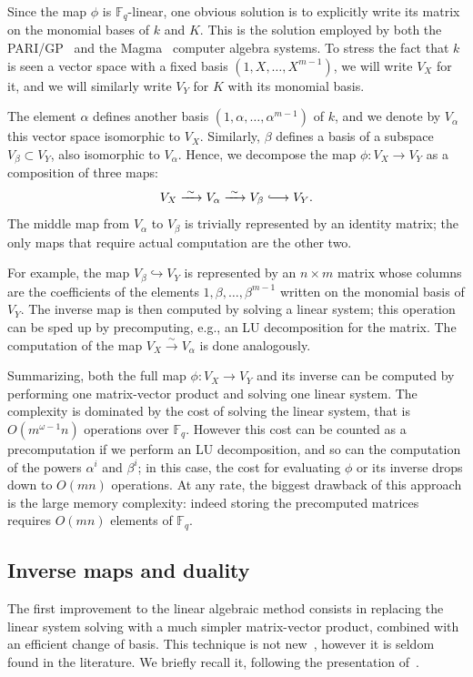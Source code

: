\documentclass[12pt]{article}
\theoremstyle{plain}
\theoremstyle{definition}
\def\F{\ensuremath{\mathbb{F}}}
\begin{document}
Since the map $\phi$ is $\F_q$-linear, one obvious solution is to
explicitly write its matrix on the monomial bases of $k$ and $K$. %
This is the solution employed by both the PARI/GP~\cite{Pari} and the
Magma~\cite{MAGMA,bosma+cannon+steel97} computer algebra systems. %
To stress the fact that $k$ is seen a vector space with a fixed basis
$(1,X,\dots,X^{m-1})$, we will write $V_X$ for it, and we will
similarly write $V_Y$ for $K$ with its monomial basis. %

The element $\alpha$ defines another basis
$(1,\alpha,\dots,\alpha^{m-1})$ of $k$, and we denote by $V_\alpha$
this vector space isomorphic to $V_X$. %
Similarly, $\beta$ defines a basis of a subspace $V_\beta\subset V_Y$,
also isomorphic to $V_\alpha$. %
Hence, we decompose the map $\phi:V_X\to V_Y$ as a composition of
three maps:
\[V_X \xrightarrow{\;\sim\;} V_\alpha \xrightarrow{\;\sim\;} V_\beta \lhook\joinrel\longrightarrow
  V_Y.\] %
The middle map from $V_\alpha$ to $V_\beta$ is trivially represented
by an identity matrix; the only maps that require actual computation
are the other two. %

For example, the map $V_\beta\hookrightarrow V_Y$ is represented by an
$n\times m$ matrix whose columns are the coefficients of the elements
$1,\beta,\dots,\beta^{m-1}$ written on the monomial basis of $V_Y$. %
The inverse map is then computed by solving a linear system; this
operation can be sped up by precomputing, e.g., an LU decomposition
for the matrix. %
The computation of the map $V_X\xrightarrow{\sim}V_\alpha$ is done
analogously.

Summarizing, both the full map $\phi:V_X\to V_Y$ and its inverse can
be computed by performing one matrix-vector product and solving one
linear system. %
The complexity is dominated by the cost of solving the linear system,
that is $O(m^{\omega-1}n)$ operations over $\F_q$. %
However this cost can be counted as a precomputation if we perform an
LU decomposition, and so can the computation of the powers $\alpha^i$
and $\beta^i$; in this case, the cost for evaluating $\phi$ or its
inverse drops down to $O(mn)$ operations. %
At any rate, the biggest drawback of this approach is the large memory
complexity: indeed storing the precomputed matrices requires $O(mn)$
elements of $\F_q$.

\subsection{Inverse maps and duality}

The first improvement to the linear algebraic method consists in
replacing the linear system solving with a much simpler matrix-vector
product, combined with an efficient change of basis. %
This technique is not
new~\cite{shoup94,shoup95,shoup99,bostan+salvy+schost03}, however it
is seldom found in the literature. %
We briefly recall it, following the presentation of~\cite{DeDoSc2014}.
\end{document}
